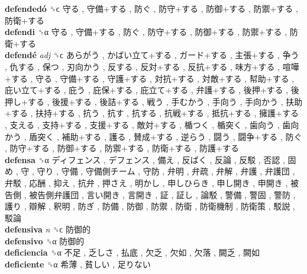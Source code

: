 \textbf{defendedó} ␝ϲ   守る ,  守備+する ,  防ぐ ,  防守+する ,  防御+する ,  防禦+する ,  防衛+する   \\
\textbf{defendi} ␝α   守る ,  守備+する ,  防ぐ ,  防守+する ,  防御+する ,  防禦+する ,  防衛+する   \\
\textbf{defendé} \emph{adj}  ␝ϲ   あらがう ,  かばい立て+する ,  ガード+する ,  主張+する ,  争う ,  仇する ,  保つ ,  刃向かう ,  反する ,  反対+する ,  反抗+する ,  味方+する ,  喧嘩+する ,  守る ,  守備+する ,  守護+する ,  対抗+する ,  対敵+する ,  幇助+する ,  庇い立て+する ,  庇う ,  庇保+する ,  庇立て+する ,  弁護+する ,  後押+する ,  後押し+する ,  後援+する ,  後詰+する ,  戦う ,  手むかう ,  手向う ,  手向かう ,  扶助+する ,  扶持+する ,  抗う ,  抗す ,  抗する ,  抗戦+する ,  抵抗+する ,  擁護+する ,  支える ,  支持+する ,  支援+する ,  敵対+する ,  楯つく ,  楯突く ,  歯向う ,  歯向かう ,  盾突く ,  補助+する ,  護る ,  賛成+する ,  逆らう ,  闘う ,  闘争+する ,  防ぐ ,  防守+する ,  防御+する ,  防禦+する ,  防衛+する ,  防護+する   \\
\textbf{defensa} ␝α   ディフェンス ,  デフェンス ,  備え ,  反ばく ,  反論 ,  反駁 ,  否認 ,  固め ,  守 ,  守り ,  守備 ,  守備側チーム ,  守防 ,  弁明 ,  弁疏 ,  弁解 ,  弁護 ,  弁護団 ,  弁駁 ,  応酬 ,  抑え ,  抗弁 ,  押さえ ,  明かし ,  申しひらき ,  申し開き ,  申開き ,  被告側 ,  被告側弁護団 ,  言い開き ,  言開き ,  証 ,  証し ,  論駁 ,  警備 ,  警固 ,  警防 ,  護り ,  辯解 ,  釈明 ,  防ぎ ,  防備 ,  防御 ,  防禦 ,  防衛 ,  防衛機制 ,  防衛策 ,  駁説 ,  駁論   \\
\textbf{defensiva} \emph{n}  ␝ϲ   防御的   \\
\textbf{defensivo} ␝α   防御的   \\
\textbf{deficiencia} ␝α   不足 ,  乏しさ ,  払底 ,  欠乏 ,  欠如 ,  欠落 ,  闕乏 ,  闕如   \\
\textbf{deficiente} ␝α   希薄 ,  貧しい ,  足りない   \\
